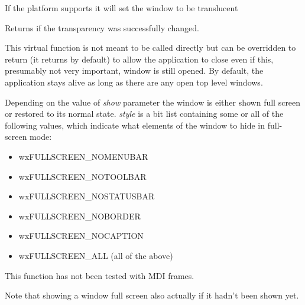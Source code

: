 If the platform supports it will set the window to be translucent



Returns \true if the transparency was successfully changed.



\label{wxtoplevelwindowshouldpreventappexit}


This virtual function is not meant to be called directly but can be overridden
to return \false (it returns \true by default) to allow the application to
close even if this, presumably not very important, window is still opened.
By default, the application stays alive as long as there are any open top level
windows.


\label{wxtoplevelwindowshowfullscreen}


Depending on the value of {\it show} parameter the window is either shown full
screen or restored to its normal state. {\it style} is a bit list containing
some or all of the following values, which indicate what elements of the window
to hide in full-screen mode:

\begin{itemize}\itemsep=0pt
\item wxFULLSCREEN\_NOMENUBAR
\item wxFULLSCREEN\_NOTOOLBAR
\item wxFULLSCREEN\_NOSTATUSBAR
\item wxFULLSCREEN\_NOBORDER
\item wxFULLSCREEN\_NOCAPTION
\item wxFULLSCREEN\_ALL (all of the above)
\end{itemize}

This function has not been tested with MDI frames.

Note that showing a window full screen also actually
 if it hadn't been shown yet.


